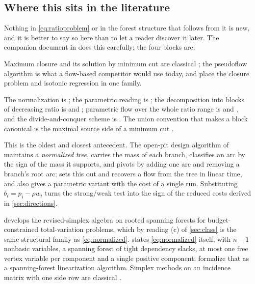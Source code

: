 \subsection{Where this sits in the literature}\label{sec:prior}
Nothing in \eqref{eq:ratioproblem} or in the forest structure that follows from it is
new, and it is better to say so here than to let a reader discover it later.
The companion document in  does this carefully; the four
blocks are:

\begin{description}[leftmargin=*,style=nextline]
\item[Closure and its reduction to flow.] Maximum closure and its solution by
  minimum cut are classical \citep{Picard1976,PicardQueyranne1982}; the
  pseudoflow algorithm \citep{Hochbaum2008} is what a flow-based competitor
  would use today, and \citet{HochbaumQueyranne2003} place the closure problem
  and isotonic regression in one family.
\item[The ratio objective and the decomposition.] The normalization is
  \citet{CharnesCooper1962}; the parametric reading is
  \citet{Dinkelbach1967}; the decomposition into blocks of decreasing ratio is
  \citet{Sidney1975} and \citet{Lawler1978}; parametric flow over the whole
  ratio range is \citet{GalloEtAl1989} and \citet{Eppstein2018}, and the
  divide-and-conquer scheme is \citet{EisnerSeverance1976}. The union
  convention that makes a block canonical is the maximal source side of a
  minimum cut \citep{PicardQueyranne1980}.
\item[Forests carrying branch aggregates.] This is the oldest and closest
  antecedent. The open-pit design algorithm of \citet{LerchsGrossmann1965}
  maintains a \emph{normalized tree}, carries the mass of each branch,
  classifies an arc by the sign of the mass it supports, and pivots by adding
  one arc and removing a branch's root arc; \citet{Hochbaum2001} sets this out
  and recovers a flow from the tree in linear time, and also gives a parametric
  variant with the cost of a single run. Substituting $b_i=p_i-\rho w_i$ turns
  the strong/weak test into the sign of the reduced costs derived in
  \cref{sec:directions}.
\item[Recent simplex work on the same shapes.] \citet{Yang2026} develops the
  revised-simplex algebra on rooted spanning forests for
  budget-constrained total-variation problems, which by reading (c) of
  \cref{sec:class} is the same structural family as \eqref{eq:normalized}.
  \citet{Wuille2025} states \eqref{eq:normalized} itself, with $n-1$ nonbasic
  variables, a spanning forest of
  tight dependency slacks, at most one free vertex variable per component and a
  single positive component; \citet{MollakhaniEtAl2026} formalize that as a
  spanning-forest linearization algorithm. Simplex methods on an incidence
  matrix with one side row are classical
  \citep{AhujaEtAl1993,Schrijver2003,HolzhauserEtAl2017}.
\end{description}

